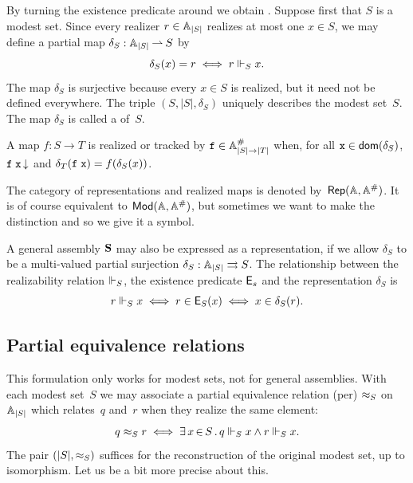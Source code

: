 By turning the existence predicate around we obtain
. Suppose first that $S$ is a modest set. Since
every realizer $r \in \mathbb{A}_{|S|}$ realizes at most one $x \in S$, we may
define a partial map $\delta_S : \mathbb{A}_{|S|} \mathbin{\rightharpoonup} S$ by
%
\begin{equation*}
  \delta_S(x) = r \iff r \Vdash_S x.
\end{equation*}
%
The map $\delta_S$ is surjective because every $x \in S$ is realized,
but it need not be defined everywhere. The triple $(S, |S|, \delta_S)$
uniquely describes the modest set~$S$. The map $\delta_S$ is called a
 of~$S$.

A map $f : S \to T$ is realized or tracked by $\mathtt{f} \in \mathbb{A}^{\#}_{|S|
  \to |T|}$ when, for all $\mathtt{x} \in \mathsf{dom}(\delta_S)$,
$\mathtt{f}\;\mathtt{x}\,{\downarrow}$ and $\delta_T(\mathtt{f}\;\mathtt{x}) =
f(\delta_S(x))$.

The category of representations and realized maps is denoted
by~$\mathsf{Rep}(\mathbb{A},\mathbb{A}^{\#})$. It is of course equivalent to $\mathsf{Mod}(\mathbb{A},
  \mathbb{A}^{\#})$, but sometimes we want to make the distinction and so we
give it a symbol.

A general assembly $\mathbf{S}$ may also be expressed as a
representation, if we allow $\delta_S$ to be a multi-valued partial
surjection $\delta_S : \mathbb{A}_{|S|} \rightrightarrows S$. The relationship between
the realizability relation $\Vdash_S$, the existence predicate $\mathsf{E}_s$
and the representation $\delta_S$ is
%
\begin{equation*}
  r \Vdash_S x \iff
  r \in \mathsf{E}_S(x) \iff
  x \in \delta_S(r).
\end{equation*}


\subsection{Partial equivalence relations}
\label{sec:pers}

This formulation only works for modest sets, not for general
assemblies. With each modest set~$S$ we may associate a partial
equivalence relation (per) $\approx_S$ on
$\mathbb{A}_{|S|}$ which relates~$q$ and~$r$ when they realize the same
element:
%
\begin{equation*}
  q \approx_S r \iff
  \exists\, x \,{\in}\, S\,.\,q \Vdash_S x \land r \Vdash_S x.
\end{equation*}
%
The pair $(|S|, {\approx_S})$ suffices for the reconstruction of the
original modest set, up to isomorphism. Let us be a bit more precise
about this.

